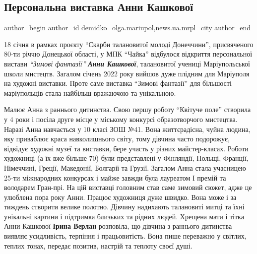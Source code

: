  
 
 
 
 
 
\subsection{Персональна виставка Анни Кашкової}
\label{sec:24_01_2022.stz.news.ua.mrpl_city.1.personalna_vystavka_anny_kashkovoj}
 
\ifcmt
 author_begin
   author_id demidko_olga.mariupol,news.ua.mrpl_city
 author_end
\fi


18 січня в рамках проєкту \enquote{Скарби талановитої молоді Донеччини}, присвяченого
80-ти річчю Донецької області, у МПК \enquote{Чайка} відбулося відкриття персональної
вистави \emph{\enquote{Зимові фантазії}} \emph{\textbf{Анни Кашкової}}, талановитої учениці Маріупольської
школи мистецтв. Загалом січень 2022 року вийшов дуже плідним для Маріуполя на
художні виставки. Проте саме виставка \enquote{Зимові фантазії} для більшості
маріупольців стала найбільш вражаючою та унікальною.

Малює Анна з раннього дитинства. Свою першу роботу \enquote{Квітуче поле} створила у 4
роки і посіла друге місце у міському конкурсі образотворчого мистецтва. Наразі
Анна навчається у 10 класі ЗОШ №41. Вона життєрадісна, чуйна людина, яку
приваблює краса навколишнього світу, тому дівчина часто подорожує, відвідує
художні музеї та виставки, бере участь у різних майстер-класах. Роботи
художниці (а їх вже більше 70) були представлені у Фінляндії, Польщі, Франції,
Німеччині, Греції, Македонії, Болгарії та Грузії. Загалом Анна стала учасницею
25-ти міжнародних конкурсах і майже завжди була лауреатом І премій та володарем
Гран-прі. На цій виставці головним став саме зимовий сюжет, адже це улюблена
пора року Анни. Працює художниця дуже швидко. Вона може і за тиждень створити
велике полотно. Дівчину надихають талановиті митці та їхні унікальні картини і
підтримка близьких та рідних людей. Хрещена мати і тітка Анни Кашкової \textbf{Ірина
Верлан} розповіла, що дівчина з раннього дитинства виявляє усидливість, терпіння
і працьовитість. Вона пише переважно у світлих, теплих тонах, передає позитив,
настрій та теплоту своєї душі.

